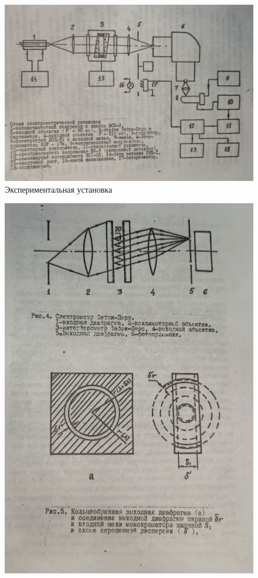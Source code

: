 \documentclass[a4paper, 12pt]{article}%
\begin{document}
	\begin{figure}[H]
		\centering
		\includegraphics[width=1\linewidth]{ust.jpeg}
		\caption{Экспериментальная установка}
	\end{figure}
		\begin{figure}[H]
		\centering
		\includegraphics[width=1\linewidth]{F-P.jpg}
	\end{figure}
\end{document}
